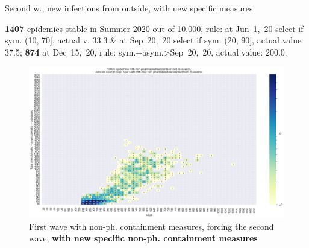 \documentclass[9pt]{beamer}
\begin{document}
\begin{frame}{Second w., new infections from outside, with new specific measures}


\textbf{1407} {\tiny epidemics stable in Summer 2020 out of 10,000, rule: at Jun~1,~20 select if sym. (10, 70], actual v. 33.3 \& at Sep~20,~20 select if sym. (20, 90], actual value 37.5;} \textbf{874} {\tiny at Dec~15,~20, rule: sym.+asym.>Sep~20,~20, actual value: 200.0.}

\begin{figure}[H]
\center
\includegraphics[scale=0.17]{10kForceWave2Contr2.png}
\caption{First wave with non-ph. containment measures, forcing the second wave, \textbf{with new specific non-ph. containment measures}}
\label{selForceWave2Contr2}
\end{figure}



\end{frame}
\end{document}
